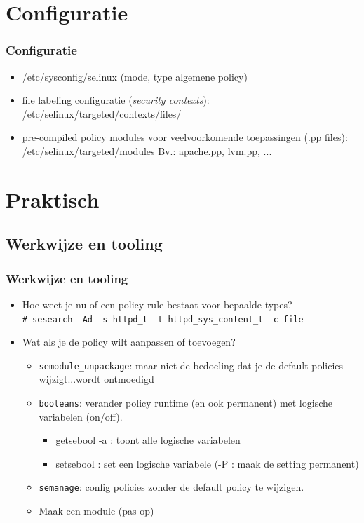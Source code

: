 \section{Configuratie}
\begin{styleframe}
    \frametitle{Configuratie}
\pause
\begin{itemize}
	\item /etc/sysconfig/selinux (mode, type algemene policy)
	\pause
	\item file labeling configuratie ({\it security contexts}): /etc/selinux/targeted/contexts/files/
	\pause
	\item pre-compiled policy modules voor veelvoorkomende toepassingen (\*.pp files): /etc/selinux/targeted/modules
Bv.: apache.pp, lvm.pp, ...
\end{itemize}
\end{styleframe}

\section{Praktisch}
\subsection{Werkwijze en tooling}
\begin{styleframe}
    \frametitle{Werkwijze en tooling}
\begin{itemize}
	\pause
	\item  Hoe weet je nu of een policy-rule bestaat voor bepaalde types?\\
	\pause
	{\scriptsize
	{\tt \# sesearch -Ad -s httpd\_t -t httpd\_sys\_content\_t -c file}}
	\pause
	\item Wat als je de policy wilt aanpassen of toevoegen? 
	\begin{itemize}
		\pause
		\item {\tt semodule\_unpackage}: maar niet de bedoeling dat je de default policies wijzigt...wordt ontmoedigd
		\pause
		\item {\tt booleans}: verander policy runtime (en ook permanent) met logische variabelen (on/off).
		\begin{itemize}
			\item getsebool -a : toont alle logische variabelen
			\item setsebool : set een logische variabele (-P : maak de setting permanent)
		\end{itemize}
		\pause
		\item {\tt semanage}: config policies zonder de default policy te wijzigen.
		\item Maak een module (pas op)
	\end{itemize}
\end{itemize}
\end{styleframe}

